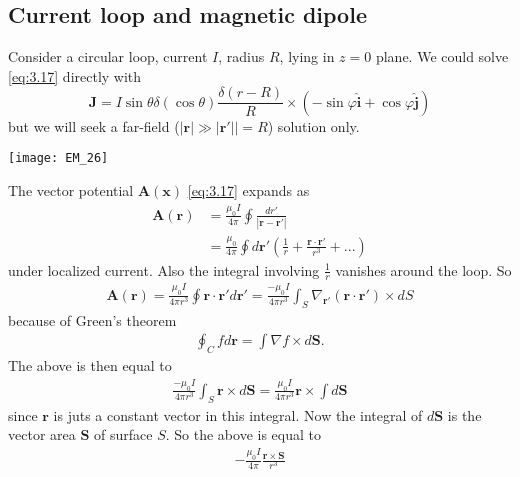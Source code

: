 \documentclass[a4paper]{article}
\begin{document}
\subsection{Current loop and magnetic dipole}
Consider a circular loop, current $I$, radius $R$, lying in $z=0$ plane. We could solve \eqref{eq:3.17} directly with $$\mathbf{J} = I\sin\theta \delta(\cos\theta) \frac{\delta(r-R)}{R} \times (-\sin\varphi \hat{\mathbf{i}} + \cos\varphi\hat{\mathbf{j}})$$ but we will seek a far-field ($|\mathbf{r}| \gg |\mathbf{r}'|| = R$) solution only.

\texttt{[image: EM\_26]}

The vector potential $\mathbf{A}(\mathbf{x})$ \eqref{eq:3.17} expands as
\begin{equation*}\tag{3.20} \label{eq:3.20}
\begin{aligned}
\mathbf{A}(\mathbf{r}) &= \frac{\mu_0I}{4\pi} \oint \frac{dr'}{|\mathbf{r}-\mathbf{r}'|}\\
&= \frac{\mu_0}{4\pi} \oint d\mathbf{r}' \left(\frac{1}{r} + \frac{\mathbf{r} \cdot \mathbf{r}'}{r^3} + ... \right) 
\end{aligned}
\end{equation*}
under localized current. Also the integral involving $\frac{1}{r}$ vanishes around the loop. So
\begin{equation*}
\begin{aligned}
\mathbf{A}(\mathbf{r}) = \frac{\mu_0I}{4\pi r^3} \oint \mathbf{r}\cdot\mathbf{r}' d\mathbf{r}' = \frac{-\mu_0I}{4\pi r^3} \int_S \nabla_{\mathbf{r}'} (\mathbf{r}\cdot\mathbf{r}')\times dS
\end{aligned}
\end{equation*}
because of Green's theorem
\begin{equation*}
\begin{aligned}
\oint_C fd\mathbf{r} = \int \nabla f \times d\mathbf{S}.
\end{aligned}
\end{equation*}
The above is then equal to
\begin{equation*}
\begin{aligned}
\frac{-\mu_0I}{4\pi r^3} \int_S \mathbf{r} \times d\mathbf{S} = \frac{\mu_0I}{4\pi r^3} \mathbf{r} \times \int d\mathbf{S}
\end{aligned}
\end{equation*}
since $\mathbf{r}$ is juts a constant vector in this integral. Now the integral of $d\mathbf{S}$ is the vector area $\mathbf{S}$ of surface $S$. So the above is equal to
\begin{equation*}
\begin{aligned}
-\frac{\mu_0I}{4\pi} \frac{\mathbf{r} \times \mathbf{S}}{r^3}
\end{aligned}
\end{equation*}
\end{document}
